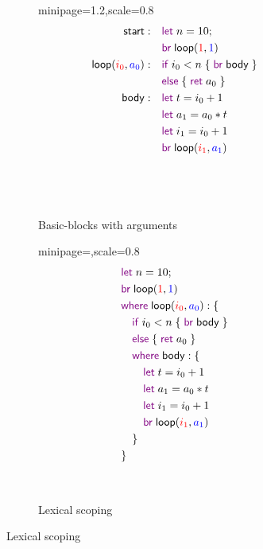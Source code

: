 \documentclass[acmsmall,screen,anonymous,review]{acmart}
\newcommand{\ms}[1]{\ensuremath{\mathsf{#1}}}
\newcommand{\kwms}[1]{\textcolor{violet}{\ms{#1}}}
\newcommand{\lbms}[1]{{\ms{#1}}}
\begin{document}
\begin{figure}
  \begin{subfigure}[t]{.35\textwidth}
    \centering
    \begin{adjustbox}{minipage=1.2\textwidth,scale=0.8}
    \begin{align*}
      \lbms{start}:\quad            & \kwms{let}\;n = 10; \\
                                    & \kwms{br}\;
                                        \lbms{loop}(\textcolor{red}{1}, \textcolor{blue}{1}) \\
      \lbms{loop}(\textcolor{red}{i_0}, \textcolor{blue}{a_0}): \quad  
                                    & \kwms{if}\;i_0 < n\; \{\;\kwms{br}\;\lbms{body}\;\} \\
                                    & \kwms{else}\;\{\;\kwms{ret}\;a_0\;\} \\
      \lbms{body}: \quad            & \kwms{let}\;t = i_0 + 1 \\
                                    & \kwms{let}\;a_1 = a_0 * t \\
                                    & \kwms{let}\;i_1 = i_0 + 1 \\
                                    & \kwms{br}\;\lbms{loop}
                                      (\textcolor{red}{i_1}, \textcolor{blue}{a_1}) 
                                    \\ \\ \\ \\
    \end{align*}
    \end{adjustbox}
    \caption{Basic-blocks with arguments}
    \label{fig:fact-bba}
  \end{subfigure}%
  \begin{subfigure}[t]{.3\textwidth}
    \begin{adjustbox}{minipage=\linewidth,scale=0.8}
    \begin{align*}
      & \kwms{let}\;n = 10; \\
      & \kwms{br}\;\lbms{loop}(\textcolor{red}{1}, \textcolor{blue}{1}) \\
      & \kwms{where}\;\lbms{loop}(\textcolor{red}{i_0}, \textcolor{blue}{a_0}): \{ \\
      & \quad \kwms{if}\;i_0 < n\;\{\;\kwms{br}\;\lbms{body}\;\} \\
      & \quad \kwms{else}\;\{\;\kwms{ret}\;a_0\;\} \\
      & \quad \kwms{where}\;\lbms{body}: \{\\ 
      & \qquad \kwms{let}\;t = i_0 + 1 \\
      & \qquad \kwms{let}\;a_1 = a_0 * t \\
      & \qquad \kwms{let}\;i_1 = i_0 + 1 \\
      & \qquad \kwms{br}\;\lbms{loop}(\textcolor{red}{i_1}, \textcolor{blue}{a_1})  \\
      & \quad \} \\
      & \}
    \end{align*}
    \end{adjustbox}
    \caption{Lexical scoping}\
    \label{fig:fact-lex}
  \end{subfigure}
  

\end{figure}
\end{document}
